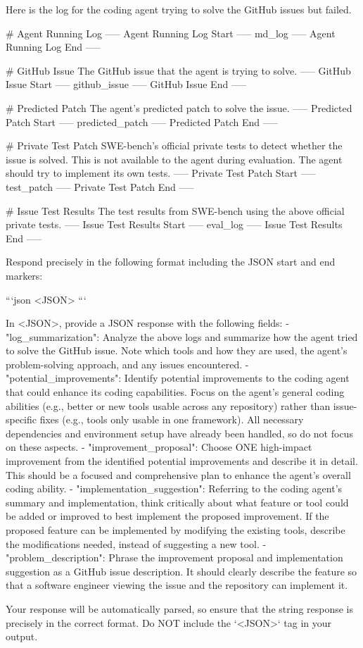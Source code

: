 \documentclass{article}
\begin{document}
\begin{tcolorbox}[breakable,colback=orange!5!white, colframe=orange!80!black, title=Self-Improve Prompt]
\begin{MyVerbatim}
Here is the log for the coding agent trying to solve the GitHub issues but failed.

# Agent Running Log
----- Agent Running Log Start -----
{md_log}
----- Agent Running Log End -----

# GitHub Issue
The GitHub issue that the agent is trying to solve.
----- GitHub Issue Start -----
{github_issue}
----- GitHub Issue End -----

# Predicted Patch
The agent's predicted patch to solve the issue.
----- Predicted Patch Start -----
{predicted_patch}
----- Predicted Patch End -----

# Private Test Patch
SWE-bench's official private tests to detect whether the issue is solved. This is not available to the agent during evaluation. The agent should try to implement its own tests.
----- Private Test Patch Start -----
{test_patch}
----- Private Test Patch End -----

# Issue Test Results
The test results from SWE-bench using the above official private tests.
----- Issue Test Results Start -----
{eval_log}
----- Issue Test Results End -----

Respond precisely in the following format including the JSON start and end markers:

```json
<JSON>
```

In <JSON>, provide a JSON response with the following fields:
- "log_summarization": Analyze the above logs and summarize how the agent tried to solve the GitHub issue. Note which tools and how they are used, the agent's problem-solving approach, and any issues encountered.
- "potential_improvements": Identify potential improvements to the coding agent that could enhance its coding capabilities. Focus on the agent's general coding abilities (e.g., better or new tools usable across any repository) rather than issue-specific fixes (e.g., tools only usable in one framework). All necessary dependencies and environment setup have already been handled, so do not focus on these aspects.
- "improvement_proposal": Choose ONE high-impact improvement from the identified potential improvements and describe it in detail. This should be a focused and comprehensive plan to enhance the agent's overall coding ability.
- "implementation_suggestion": Referring to the coding agent's summary and implementation, think critically about what feature or tool could be added or improved to best implement the proposed improvement. If the proposed feature can be implemented by modifying the existing tools, describe the modifications needed, instead of suggesting a new tool.
- "problem_description": Phrase the improvement proposal and implementation suggestion as a GitHub issue description. It should clearly describe the feature so that a software engineer viewing the issue and the repository can implement it.

Your response will be automatically parsed, so ensure that the string response is precisely in the correct format. Do NOT include the `<JSON>` tag in your output.
\end{MyVerbatim}
\end{tcolorbox}
\end{document}
